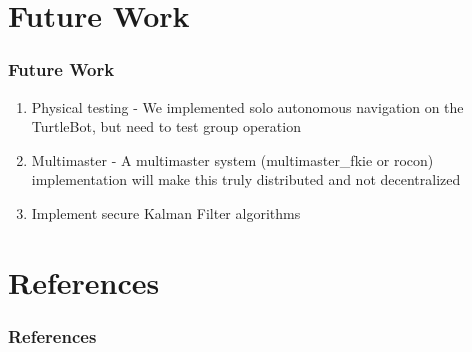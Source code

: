 \documentclass[14pt]{beamer}
\begin{document}
\section{Future Work}
\begin{frame}
\frametitle{Future Work}
\begin{enumerate}
\item Physical testing - We implemented solo autonomous navigation on the TurtleBot, but need to test group operation
\item Multimaster - A multimaster system (multimaster\_fkie or rocon) implementation will make this truly distributed and not decentralized
\item Implement secure Kalman Filter algorithms
\end{enumerate}
\end{frame}

\section{References}
\begin{frame}[allowframebreaks]
\frametitle{References}
\printbibliography
\end{frame}
\end{document}
